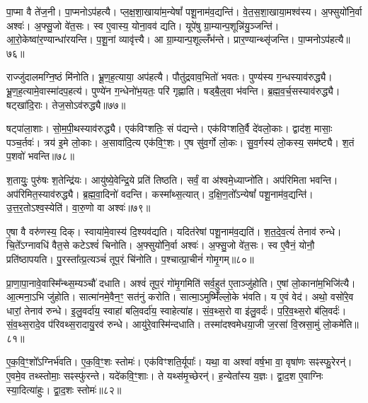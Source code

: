 पा॒प्मा वै ते॑ज॒नी।
पा॒प्मनो\-ऽप॑हत्यै।
प्ल॒क्ष॒शा॒खाया॑म॒न्येषां᳚ पशू॒नाम॑व॒द्यन्ति॑।
वे॒त॒स॒शा॒खाया॒मश्व॑स्य।
अ॒फ्सुयो॑नि॒र्वा अश्वः॑।
अ॒फ्सु॒जो वे॑त॒सः।
स्व ए॒वास्य॒ योना॒वव॑ द्यति।
यूपे॑षु ग्रा॒म्यान्\-प॒शून्नि॑यु॒ञ्जन्ति॑।
आ॒रो॒केष्वा॑र॒ण्यान्धा॑रयन्ति।
प॒शू॒नां व्यावृ॑त्त्यै।
आ ग्रा॒म्यान्प॒शूल्लँभ॑न्ते।
प्रार॒ण्यान्थ्सृ॑जन्ति।
पा॒प्मनो\-ऽप॑हत्यै॥७६॥\ip\anuvakamend[अश्व॑स्य॒ व्यावृ॑त्त्यै॒ त्रीणि॑ च]

राज्जु॑दालमग्नि॒ष्ठं मि॑नोति।
भ्रू॒ण॒ह॒त्याया॒ अप॑हत्यै।
पौतु॑द्रवाव॒भितो॑ भवतः।
पुण्य॑स्य ग॒न्धस्या\-व॑\-रुद्ध्यै।
भ्रू॒ण॒ह॒त्या\-मे॒वा\-स्मा॑दप॒हत्य॑।
पुण्ये॑न ग॒न्धेनो॑भ॒यतः॒ परि॑ गृह्णाति।
षड्बै॒ल्॒वा भ॑वन्ति।
ब्र॒ह्म॒व॒र्च॒सस्या\-व॑\-रुद्ध्यै।
षट्खा॑दि॒राः।
तेज॒सो\-ऽव॑रुद्ध्यै॥७७॥\ip

षट्पा॑ला॒शाः।
सो॒म॒पी॒थस्या\-व॑\-रुद्ध्यै।
एक॑विꣳशतिः॒ सं प॑द्यन्ते।
एक॑विꣳशति॒र्वै दे॑वलो॒काः।
द्वाद॑श॒ मासाः॒ पञ्च॒र्तवः॑।
त्रय॑ इ॒मे लो॒काः।
अ॒सावा॑दि॒त्य एक॑वि॒ꣳ॒शः।
ए॒ष सु॑व॒र्गो लो॒कः।
सु॒व॒र्गस्य॑ लो॒कस्य॒ सम॑ष्ट्यै।
श॒तं प॒शवो॑ भवन्ति॥७८॥\ip

श॒तायुः॒ पुरु॑षः श॒तेन्द्रि॑यः।
आयु॑ष्ये॒वेन्द्रि॒ये प्रति॑ तिष्ठति।
सर्वं॒ वा अ॑श्वमे॒ध्याप्नो॑ति।
अप॑रिमिता भवन्ति।
अप॑रिमित॒स्या\-व॑\-रुद्ध्यै।
ब्र॒ह्म॒वा॒दिनो॑ वदन्ति।
कस्मा᳚थ्स॒त्यात्।
द॒क्षि॒ण॒तो᳚\-ऽन्येषां᳚ पशू॒ना\-म॑व॒\-द्यन्ति॑।
उ॒त्त॒र॒तो\-ऽश्व॒स्येति॑।
वा॒रु॒णो वा अश्वः॑॥७९॥\ip

ए॒षा वै वरु॑णस्य॒ दिक्।
स्वाया॑मे॒वास्य॑ दि॒श्यव॑द्यति।
यदित॑रेषां पशू॒नाम॑व॒द्यति॑।
श॒त॒दे॒व॒त्यं॑ तेनाव॑ रुन्धे।
चि॒ते᳚\-ऽग्नावधि॑ वैत॒से कटे\-ऽश्वं॑ चिनोति।
अ॒फ्सुयो॑नि॒र्वा अश्वः॑।
अ॒फ्सु॒जो वे॑त॒सः।
स्व ए॒वैनं॒ योनौ॒ प्रति॑\-ष्ठापयति।
पु॒रस्ता᳚त्प्र॒त्यञ्चं॑ तूप॒रं चि॑नोति।
प॒श्चात्प्रा॒चीनं॑ गोमृ॒गम्॥८०॥\ip

प्रा॒णा॒पा॒नावे॒वास्मि᳚न्थ्स॒म्यञ्चौ॑ दधाति।
अश्वं॑ तूप॒रं गो॑मृ॒गमिति॑ सर्व॒हुत॑ ए॒ताञ्जु॑होति।
ए॒षां लो॒काना॑म॒भिजि॑त्यै।
आ॒त्मना॒ऽभि जु॑\-होति।
सात्मा॑नमे॒वैन॒ꣳ॒ सत॑नुं करोति।
सात्मा॒\-ऽमुष्मिँ॑ल्लो॒के भ॑वति।
य ए॒वं वेद॑।
अथो॒ वसो॑रे॒व धारां॒ तेनाव॑ रुन्धे।
इ॒लु॒\-वर्दा॑य॒ स्वाहा॑ बलि॒वर्दा॑य॒ स्वाहेत्या॑ह।
सं॒व॒थ्स॒रो वा इ॑लु॒वर्दः॑।
प॒रि॒\-व॒थ्स॒रो ब॑लि॒वर्दः॑।
सं॒व॒थ्स॒रा\-दे॒व प॑रि\-वथ्स॒रा\-दायु॒रव॑ रुन्धे।
आयु॑\-रे॒वा\-स्मि॑न्दधाति।
तस्मा॑दश्वमेधया॒जी ज॒रसा॑ वि॒स्रसा॒मुं लो॒कमे॑ति॥८१॥\ip\anuvakamend[तेज॒सो\-ऽव॑रुद्ध्यै भव॒न्त्यश्वो॑ गोमृ॒गमि॑लु॒वर्द॑श्च॒त्वारि॑ च]

ए॒क॒वि॒ꣳ॒शो᳚\-ऽग्निर्भ॑वति।
ए॒क॒वि॒ꣳ॒शः स्तोमः॑।
एक॑\-विꣳशति॒र्यूपाः᳚।
यथा॒ वा अश्वा॑ वर्\mbox{}ष॒भा वा॒ वृषा॑णः सꣴस्फु॒रेरन्॑।
ए॒वमे॒व तथ्स्तोमाः॒ सꣴस्फु॑रन्ते।
यदे॑कवि॒ꣳ॒शाः।
ते यथ्स॑मृ॒च्छेरन्॑।
ह॒न्येता᳚स्य य॒ज्ञः।
द्वा॒द॒श ए॒वाग्निः स्या॒दित्या॑हुः।
द्वा॒द॒शः स्तोमः॑॥८२॥\ip

